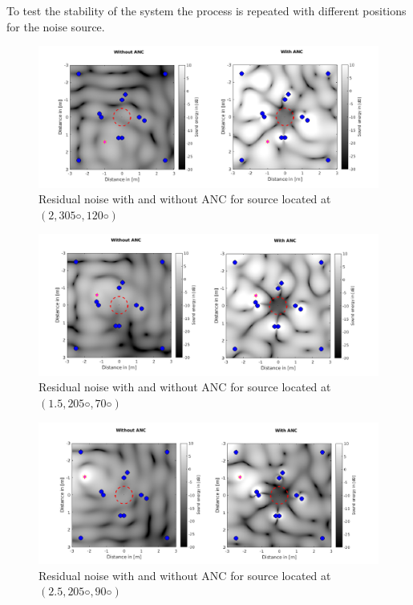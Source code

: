 To test the stability of the system the process is repeated with different positions for the noise source.
\begin{figure}[H]
    \centerline{\includegraphics[width=180mm,keepaspectratio]{LaTeX/images/plots/ANC_2_both.png}}
    \caption{Residual noise with and without ANC for source located at $(2, 305◦ , 120◦)$}
    \label{fig:ANC1}
\end{figure}
\begin{figure}[H]
    \centerline{\includegraphics[width=\textwidth]{LaTeX/images/plots/ANC_3_both.png}}
    \caption{Residual noise with and without ANC for source located at $(1.5, 205◦ , 70◦)$}
    \label{fig:ANC1}
\end{figure}
\begin{figure}[H]
    \centerline{\includegraphics[width=\textwidth]{LaTeX/images/plots/ANC_4_both.png}}
    \caption{Residual noise with and without ANC for source located at $(2.5, 205◦ , 90◦)$}
    \label{fig:ANC1}
\end{figure}
